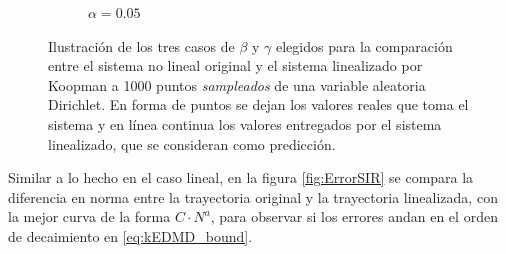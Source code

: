 \begin{figure}[htbp]
\begin{subfigure}[b]{0.45\textwidth}
        \caption{$\alpha=0.05$}
    \end{subfigure}
    \caption{Ilustración de los tres casos de $\beta$ y $\gamma$ elegidos para la comparación entre el sistema no lineal original y el sistema linealizado por Koopman a 1000 puntos \textit{sampleados} de una variable aleatoria Dirichlet. En forma de puntos se dejan los valores reales que toma el sistema y en línea continua los valores entregados por el sistema linealizado, que se consideran como predicción.}
    \label{fig:Comp_traj_SIR}
\end{figure}
Similar a lo hecho en el caso lineal, en la figura \ref{fig:ErrorSIR} se compara la diferencia en norma entre la trayectoria original y la trayectoria linealizada, con la mejor curva de la forma $C \cdot N^{a}$, para observar si los errores andan en el orden de decaimiento en \eqref{eq:kEDMD_bound}.
